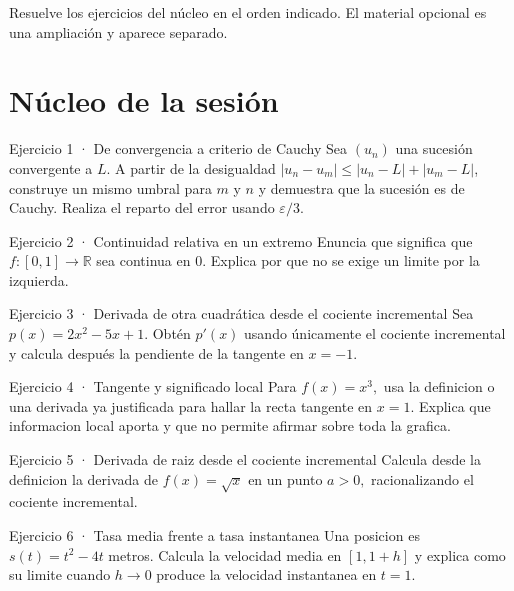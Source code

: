 \documentclass[10pt,a4paper,oneside,openany]{book}
\begin{document}
Resuelve los ejercicios del núcleo en el orden indicado. El material opcional es una ampliación y aparece separado.
\section*{Núcleo de la sesión}
\begin{PSevenExerciseFixed}{Ejercicio 1 · De convergencia a criterio de Cauchy}
Sea \((u_n)\) una sucesión convergente a \(L\). A partir de la desigualdad \(|u_n-u_m|\le |u_n-L|+|u_m-L|\), construye un mismo umbral para \(m\) y \(n\) y demuestra que la sucesión es de Cauchy. Realiza el reparto del error usando \(\varepsilon/3\).
\end{PSevenExerciseFixed}
\begin{PSevenExerciseFixed}{Ejercicio 2 · Continuidad relativa en un extremo}
Enuncia que significa que \(f:[0,1]\to \mathbb{R}\) sea continua en \(0\). Explica por que no se exige un limite por la izquierda.
\end{PSevenExerciseFixed}
\begin{PSevenExerciseFixed}{Ejercicio 3 · Derivada de otra cuadrática desde el cociente incremental}
Sea \(p(x)=2x^{2}-5x+1\). Obtén \(p'(x)\) usando únicamente el cociente incremental y calcula después la pendiente de la tangente en \(x=-1\).
\end{PSevenExerciseFixed}
\begin{PSevenExerciseFixed}{Ejercicio 4 · Tangente y significado local}
Para \(f(x)=x^{3},\) usa la definicion o una derivada ya justificada para hallar la recta tangente en \(x=1\). Explica que informacion local aporta y que no permite afirmar sobre toda la grafica.
\end{PSevenExerciseFixed}
\begin{PSevenExerciseFixed}{Ejercicio 5 · Derivada de raiz desde el cociente incremental}
Calcula desde la definicion la derivada de \(f(x)=\sqrt{x}\) en un punto \(a>0,\) racionalizando el cociente incremental.
\end{PSevenExerciseFixed}
\begin{PSevenExerciseFixed}{Ejercicio 6 · Tasa media frente a tasa instantanea}
Una posicion es \(s(t)=t^{2}-4t\) metros. Calcula la velocidad media en \([1,1+h]\) y explica como su limite cuando \(h\to 0\) produce la velocidad instantanea en \(t=1\).
\end{PSevenExerciseFixed}
\end{document}
